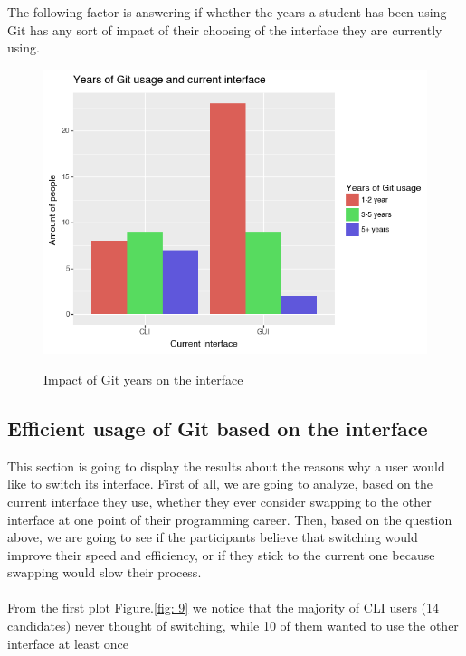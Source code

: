\documentclass[]{report}
\begin{document}
		The following factor is answering if whether the years a student has been using Git has any sort of impact of their choosing of the interface they are currently using.
		\begin{figure}[H]
			\centering
			\includegraphics[width=0.75\linewidth]{YearsGitImpact}\\
			\caption{Impact of Git years on the interface}
			\label{fig: 8}
		\end{figure}

		\subsection{Efficient usage of Git based on the interface}
		
		This section is going to display the  results about the reasons why a user would like to switch its interface. First of all, we are going to analyze, based on the current interface they use, whether they ever consider swapping to the other interface at one point of their programming career.
		Then, based on the question above, we are going to see if the participants believe that switching would improve their speed and efficiency, or if they stick to the current one because swapping would slow their process.\\\\
		
		From the first plot Figure.\ref{fig: 9} we notice that the majority of CLI users (14 candidates) never thought of switching, while 10 of them wanted to use the other interface at least once
		
\end{document}
